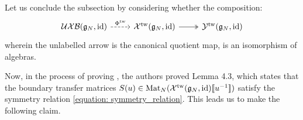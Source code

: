             Let us conclude the subsection by considering whether the composition:
                \begin{equation} \label{equation: mapping_IMO_reflection_algebras_to_BCD0_twisted_yangians}
                    \begin{tikzcd}
                        {\UXB(\g_N, \id)} & {\calX^{\tw}(\g_N, \id)} & {\calY^{\tw}(\g_N, \id)}
                        \arrow["{\Phi^{\tw}}", dashed, from=1-1, to=1-2]
                        \arrow[two heads, from=1-2, to=1-3]
                    \end{tikzcd}
                \end{equation}
            wherein the unlabelled arrow is the canonical quotient map, is an isomorphism of algebras. 

            Now, in the process of proving \cite[Theorem 4.1]{guay_regelskis_twisted_yangians_for_symmetric_pairs_of_types_BCD}, the authors proved Lemma 4.3, which states that the boundary transfer matrices $S(u) \in \mathrm{Mat}_N( \mathcal{X}^{\mathrm{tw}}(\mathfrak{g}_N, \mathrm{id})[\![u^{-1}]\!] )$ satisfy the symmetry relation \eqref{equation: symmetry_relation}. This leads us to make the following claim.

